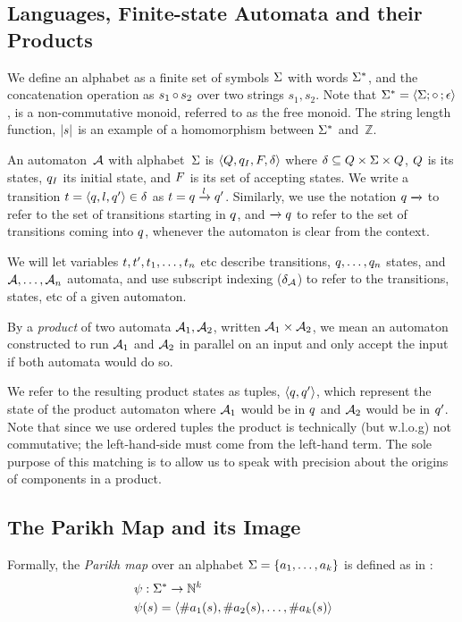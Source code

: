 \documentclass[acmsmall,review,anonymous,screen]{acmart}\settopmatter{printfolios=true,printccs=true,printacmref=true}
\theoremstyle{definition}
\begin{document}
\subsection{Languages, Finite-state Automata and their Products}

We define an alphabet as a finite set of symbols $\Sigma$ with words $\Sigma^*$, and
the concatenation operation as $s_1 \operatorname{\circ}{} s_2$ over two strings $s_1, s_2$.
Note that $\Sigma^* = \left\langle\Sigma;\operatorname{\circ}{};\epsilon\right\rangle$, is a
non-commutative monoid, referred to as the free monoid. The string length
function, $|s|$ is an example of a homomorphism between $\Sigma^*$
and~$\mathbb{Z}$.

An automaton~$\mathcal{A}$ with alphabet~$\Sigma$ is
$\left\langle Q, q_I, F, \delta\right\rangle$ where $\delta \subseteq Q \times \Sigma \times
Q$, $Q$ is its states, $q_I$ its
initial state, and $F$ is its set of accepting states.  We
write a transition $t = \left\langle q, l, q'\right\rangle \in
\delta$ as $t = q \xrightarrow{l} q'$.
Similarly, we use the notation $q \xrightarrow{}$ to refer to the set of
transitions starting in $q$, and $\xrightarrow{} q$ to refer to the
set of transitions coming into $q$, whenever the automaton is clear from
the context.

We will let variables $t, t', t_1, \ldots,
t_n$ etc describe transitions, $q, \ldots, q_n$ states, and
$\mathcal{A}, \ldots, \mathcal{A}_n$ automata, and use subscript indexing
($\delta_{\mathcal{A}}$) to refer to the transitions, states, etc of a given
automaton.

By a \emph{product} of two automata $\mathcal{A}_1, \mathcal{A}_2$, written
$\mathcal{A}_1 \times \mathcal{A}_2$, we mean an automaton constructed to run
$\mathcal{A}_1$ and $\mathcal{A}_2$ in parallel on an input and only accept the
input if both automata would do so.

We refer to the resulting product states as tuples, $\left\langle q, q'\right\rangle$,
which represent the state of the product automaton where $\mathcal{A}_1$ would be
in $q$ and $\mathcal{A}_2$ would be in $q'$. Note that since we use
ordered tuples the product is technically (but w.l.o.g) not commutative; the
left-hand-side must come from the left-hand term. The sole purpose of this
matching is to allow us to speak with precision about the origins of components
in a product.

\subsection{The Parikh Map and its Image}
Formally, the \textit{Parikh map} over an alphabet $\Sigma=
\left\{a_1, \ldots, a_k \right\}$ is defined as in \cite{kozen}:
$$
\begin{aligned}
& \operatorname{\psi}: \Sigma^* \rightarrow \mathbb{N}^k \\
& \operatorname{\psi}(s) = \left\langle\#a_1(s), \#a_2(s), \ldots, \#a_k(s)\right\rangle
\end{aligned}
$$
\end{document}
